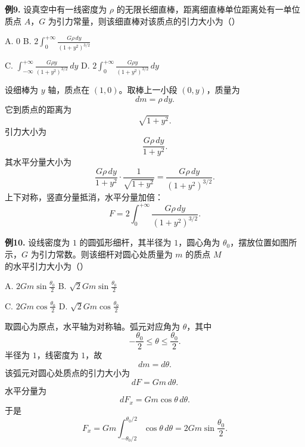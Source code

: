 \begin{problemblock}
\textbf{例9.} 设真空中有一线密度为 \(\rho\) 的无限长细直棒，距离细直棒单位距离处有一单位质点 \(A\)，\(G\) 为引力常量，则该细直棒对该质点的引力大小为（\quad）

A. \(0\)
\quad
B. \(\displaystyle 2\int_0^{+\infty}\frac{G\rho\,dy}{(1+y^2)^{3/2}}\)

C. \(\displaystyle \int_{-\infty}^{+\infty}\frac{G\rho y}{(1+y^2)^{3/2}}\,dy\)
\quad
D. \(\displaystyle 2\int_0^{+\infty}\frac{G\rho y}{(1+y^2)^{3/2}}\,dy\)
\end{problemblock}
\begin{solutionblock}
设细棒为 \(y\) 轴，质点在 \((1,0)\)。取棒上一小段 \((0,y)\)，质量为
\[
dm=\rho\,dy.
\]
它到质点的距离为
\[
\sqrt{1+y^2}.
\]
引力大小为
\[
\frac{G\rho\,dy}{1+y^2}.
\]
其水平分量大小为
\[
\frac{G\rho\,dy}{1+y^2}\cdot\frac{1}{\sqrt{1+y^2}}
=\frac{G\rho\,dy}{(1+y^2)^{3/2}}.
\]
上下对称，竖直分量抵消，水平分量加倍：
\[
F=2\int_0^{+\infty}\frac{G\rho\,dy}{(1+y^2)^{3/2}}.
\]
\end{solutionblock}

\begin{problemblock}
\textbf{例10.} 设线密度为 \(1\) 的圆弧形细杆，其半径为 \(1\)，圆心角为 \(\theta_0\)，摆放位置如图所示，\(G\) 为引力常数。则该细杆对圆心处质量为 \(m\) 的质点 \(M\) 的水平引力大小为（\quad）

A. \(\displaystyle 2Gm\sin\frac{\theta_0}{2}\)
\quad
B. \(\displaystyle \sqrt2Gm\sin\frac{\theta_0}{2}\)

C. \(\displaystyle 2Gm\cos\frac{\theta_0}{2}\)
\quad
D. \(\displaystyle \sqrt2Gm\cos\frac{\theta_0}{2}\)
\end{problemblock}
\begin{solutionblock}
取圆心为原点，水平轴为对称轴。弧元对应角为 \(\theta\)，其中
\[
-\frac{\theta_0}{2}\le \theta\le\frac{\theta_0}{2}.
\]
半径为 \(1\)，线密度为 \(1\)，故
\[
dm=d\theta.
\]
该弧元对圆心处质点的引力大小为
\[
dF=Gm\,d\theta.
\]
水平分量为
\[
dF_x=Gm\cos\theta\,d\theta.
\]
于是
\[
F_x=Gm\int_{-\theta_0/2}^{\theta_0/2}\cos\theta\,d\theta
=2Gm\sin\frac{\theta_0}{2}.
\]
\end{solutionblock}


